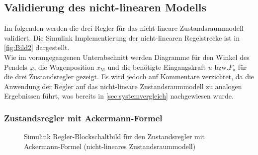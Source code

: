 \documentclass[
	pagesize,
	fontsize=12pt,
	paper=a4,
	oneside,
   reqno
]{scrartcl}
\newcommand{\bzw}{bzw.\xspace}
\begin{document}
\newpage

\subsection{Validierung des nicht-linearen Modells}
Im folgenden werden die drei Regler für das nicht-lineare Zustandsraummodell validiert. Die Simulink Implementierung der nicht-linearen Regelstrecke ist in \autoref{fig:Bild2} dargestellt. \\
\newline
Wie im vorangegangenen Unterabschnitt werden Diagramme für den Winkel des Pendels $\varphi$, die Wagenposition $x_{\mathrm{M}}$ und die benötigte Eingangskraft $u$ \bzw $F_{\mathrm{a}}$ für die drei Zustandsregler gezeigt. Es wird jedoch auf Kommentare verzichtet, da die Anwendung der Regler auf das nicht-lineare Zustandsraummodell zu analogen Ergebnissen führt, was bereits in \autoref{sec:systemvergleich} nachgewiesen wurde.

\subsubsection{Zustandsregler mit Ackermann-Formel}

\begin{figure}[H]
    \centering
    \caption[Ackermann Regler Simulink (nicht-linear)]{Simulink Regler-Blockschaltbild für den Zustandsregler mit Ackermann-Formel (nicht-lineares Zustandsraummodell)}
    \label{fig:Bild20.5}
\end{figure}
\end{document}
